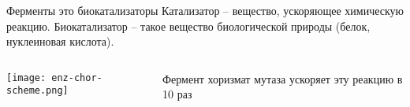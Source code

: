     
\begin{frame}[plain]
  \titlepage
\end{frame}


\begin{frame}{Ферменты это биокатализаторы}
Катализатор – вещество, ускоряющее химическую реакцию. Биокатализатор – такое вещество биологической природы (белок, нуклеиновая кислота).
\begin{columns}
\begin{column}{0.7\textwidth}
    \texttt{[image: enz-chor-scheme.png]}
\end{column}
\begin{column}{0.3\textwidth}
    Фермент хоризмат мутаза ускоряет эту реакцию в 10 раз
\end{column}
\end{columns}
\end{frame}

